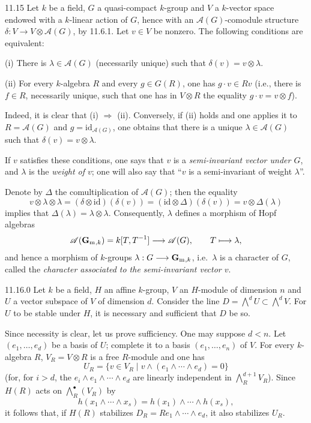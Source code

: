 \begin{definition}{11.15}\label{VIB.11.15}
Let $k$ be a field, $G$ a quasi-compact $k$-group and $V$ a $k$-vector space endowed with a $k$-linear action of $G$, hence with an $\mathscr A(G)$-comodule structure $\delta:V\to V\otimes\mathscr A(G)$, by 11.6.1. Let $v\in V$ be nonzero. The following conditions are equivalent:

(i) There is $\lambda\in\mathscr A(G)$ (necessarily unique) such that $\delta(v)=v\otimes\lambda$.

(ii) For every $k$-algebra $R$ and every $g\in G(R)$, one has $g\cdot v\in Rv$ (i.e., there is $f\in R$, necessarily unique, such that one has in $V\otimes R$ the equality $g\cdot v=v\otimes f$).

Indeed, it is clear that (i) $\Rightarrow$ (ii). Conversely, if (ii) holds and one applies it to $R=\mathscr A(G)$ and $g=\mathrm{id}_{\mathscr A(G)}$, one obtains that there is a unique $\lambda\in\mathscr A(G)$ such that $\delta(v)=v\otimes\lambda$.

If $v$ satisfies these conditions, one says that $v$ is a \emph{semi-invariant vector under $G$}, and $\lambda$ is the \emph{weight of $v$}; one will also say that ``$v$ is a semi-invariant of weight $\lambda$''.
\end{definition}
Denote by $\Delta$ the comultiplication of $\mathscr A(G)$; then the equality
\[
v\otimes\lambda\otimes\lambda=(\delta\otimes\mathrm{id})(\delta(v))=(\mathrm{id}\otimes\Delta)(\delta(v))=v\otimes\Delta(\lambda)
\]
implies that $\Delta(\lambda)=\lambda\otimes\lambda$. Consequently, $\lambda$ defines a morphism of Hopf algebras
\[
\mathscr A(\mathbf{G}_{\mathrm{m}}{}_{,k})=k[T,T^{-1}]\longrightarrow\mathscr A(G),\qquad T\longmapsto\lambda,
\]
and hence a morphism of $k$-groups $\lambda:G\longrightarrow\mathbf{G}_{\mathrm{m}}{}_{,k}$, i.e.\ $\lambda$ is a character of $G$, called the \emph{character associated to the semi-invariant vector $v$}.

\begin{lemma}{11.16.0}\label{VIB.11.16.0}
Let $k$ be a field, $H$ an affine $k$-group, $V$ an $H$-module of dimension $n$ and $U$ a vector subspace of $V$ of dimension $d$. Consider the line $D=\bigwedge^d U\subset\bigwedge^d V$. For $U$ to be stable under $H$, it is necessary and sufficient that $D$ be so.
\end{lemma}
Since necessity is clear, let us prove sufficiency. One may suppose $d<n$. Let $(e_1,\ldots,e_d)$ be a basis of $U$; complete it to a basis $(e_1,\ldots,e_n)$ of $V$. For every $k$-algebra $R$, $V_R=V\otimes R$ is a free $R$-module and one has
\[
U_R=\{v\in V_R\mid v\wedge(e_1\wedge\cdots\wedge e_d)=0\}
\]
(for, for $i>d$, the $e_i\wedge e_1\wedge\cdots\wedge e_d$ are linearly independent in $\bigwedge_R^{d+1}V_R$). Since $H(R)$ acts on $\bigwedge_R^\bullet(V_R)$ by
\[
h(x_1\wedge\cdots\wedge x_s)=h(x_1)\wedge\cdots\wedge h(x_s),
\]
it follows that, if $H(R)$ stabilizes $D_R=Re_1\wedge\cdots\wedge e_d$, it also stabilizes $U_R$.

